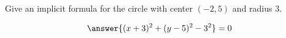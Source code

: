 \documentclass{ximera}
\author{Bart Snapp}
\begin{document}
\begin{exercise}
  Give an implicit formula for the circle with center $(-2,5)$ and radius $3$.
  \begin{prompt}
  \[
  \answer{(x+3)^2 + (y-5)^2-3^2}=0
  \]
  \end{prompt}
\end{exercise}
\end{document}
